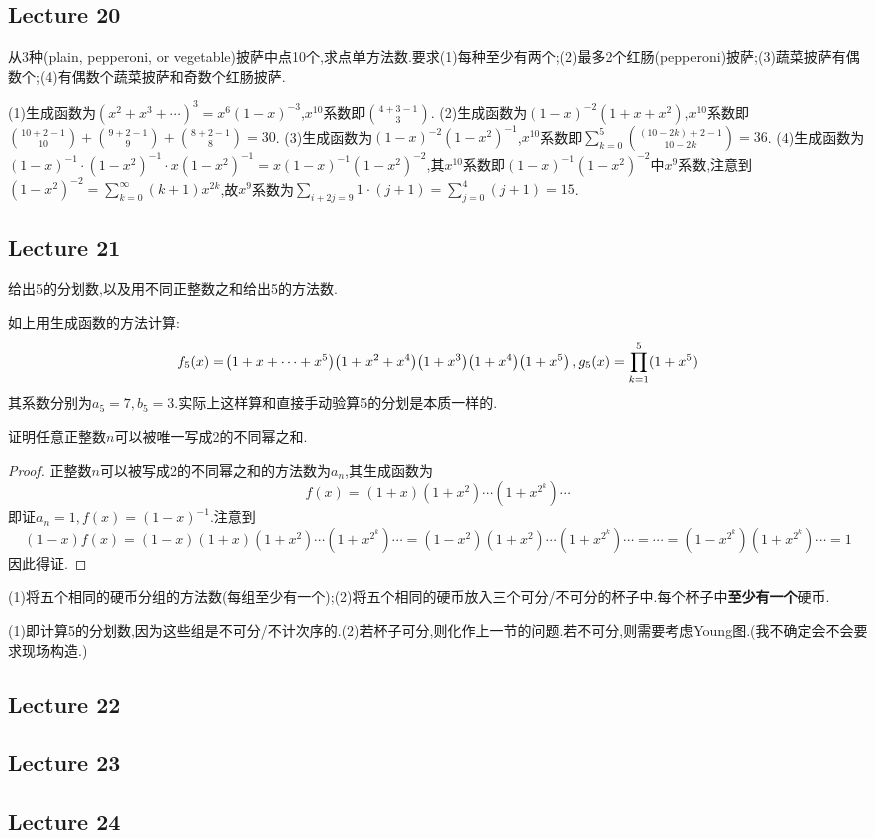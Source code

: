 \documentclass[11pt]{article}
\begin{document}
\subsection{Lecture 20}
\begin{example}
    从3种(plain, pepperoni, or vegetable)披萨中点10个,求点单方法数.要求(1)每种至少有两个;(2)最多2个红肠(pepperoni)披萨;(3)蔬菜披萨有偶数个;(4)有偶数个蔬菜披萨和奇数个红肠披萨.
\end{example}
(1)生成函数为$(x^2+x^3+\cdots)^3=x^6(1-x)^{-3}$,$x^{10}$系数即$\binom{4+3-1}{3}$. (2)生成函数为$(1-x)^{-2}(1+x+x^2)$,$x^{10}$系数即$\binom{10+2-1}{10}+\binom{9+2-1}{9}+\binom{8+2-1}{8}=30$. (3)生成函数为$(1-x)^{-2}(1-x^2)^{-1}$,$x^{10}$系数即$\sum_{k=0}^5 \binom{(10-2k)+2-1}{10-2k}=36$. (4)生成函数为$(1-x)^{-1}\cdot(1-x^2)^{-1}\cdot x(1-x^2)^{-1}=x(1-x)^{-1}(1-x^2)^{-2}$,其$x^{10}$系数即$(1-x)^{-1}(1-x^2)^{-2}$中$x^9$系数,注意到$(1-x^2)^{-2}=\sum_{k=0}^{\infty}(k+1)x^{2k}$,故$x^9$系数为$\sum_{i+2j=9}1\cdot(j+1)=\sum_{j=0}^{4}(j+1)=15$.

\subsection{Lecture 21}
\begin{example}
    给出5的分划数,以及用不同正整数之和给出5的方法数.
\end{example}
如上用生成函数的方法计算:
$$f_5(x)=\!\left(1+x+\cdots+x^5\right)\!\left(1+x^2+x^4\right)\!\left(1+x^3\right)\!\left(1+x^4\right)\!\left(1+x^5\right), g_5(x)=\prod_{k=1}^{5}(1+x^5)$$
其系数分别为$a_5=7, b_5=3$.实际上这样算和直接手动验算5的分划是本质一样的.

\begin{example}
    证明任意正整数$n$可以被唯一写成2的不同幂之和.
\end{example}
\begin{proof}
    正整数$n$可以被写成2的不同幂之和的方法数为$a_n$,其生成函数为
    $$f(x)=(1+x)(1+x^2)\cdots(1+x^{2^k})\cdots$$
    即证$a_n=1, f(x)=(1-x)^{-1}$.注意到
    $$(1-x)f(x)=(1-x)(1+x)(1+x^2)\cdots(1+x^{2^k})\cdots=(1-x^2)(1+x^2)\cdots(1+x^{2^k})\cdots=\cdots=(1-x^{2^k})(1+x^{2^k})\cdots=1$$
    因此得证.
\end{proof}

\begin{example}
    (1)将五个相同的硬币分组的方法数(每组至少有一个);(2)将五个相同的硬币放入三个可分/不可分的杯子中.每个杯子中\textbf{至少有一个}硬币.
\end{example}
(1)即计算5的分划数,因为这些组是不可分/不计次序的.(2)若杯子可分,则化作上一节的问题.若不可分,则需要考虑Young图.(我不确定会不会要求现场构造.)

\subsection{Lecture 22}

\subsection{Lecture 23}

\subsection{Lecture 24}
\end{document}
